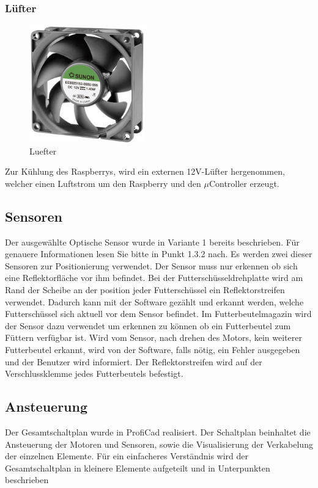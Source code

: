 \subsubsection{Lüfter}
\begin{figure}[H] 
\begin{center}

\includegraphics[width=5cm]{Bilder/Bauteile/Luefter}
\caption{Luefter}
\label{Luefter}

\end{center}
\end{figure}
Zur Kühlung des Raspberrys, wird ein externen 12V-Lüfter hergenommen, welcher einen Luftstrom um den Raspberry und den $\mu$Controller erzeugt.
\subsection{Sensoren}
Der ausgewählte Optische Sensor wurde in Variante 1 bereits beschrieben. Für genauere Informationen lesen Sie bitte in Punkt 1.3.2 nach.
Es werden zwei dieser Sensoren zur Positionierung verwendet. Der Sensor muss nur erkennen ob sich eine Reflektorfläche vor ihm befindet. Bei der Futterschüsseldrehplatte wird am Rand der Scheibe an der position jeder Futterschüssel ein Reflektorstreifen verwendet. Dadurch kann mit der Software gezählt und erkannt werden, welche Futterschüssel sich aktuell vor dem Sensor befindet. Im Futterbeutelmagazin wird der Sensor dazu verwendet um erkennen zu können ob ein Futterbeutel zum Füttern verfügbar ist. Wird vom Sensor, nach drehen des Motors, kein weiterer Futterbeutel erkannt, wird von der Software, falls nötig, ein Fehler ausgegeben und der Benutzer wird informiert. Der Reflektorstreifen wird auf der Verschlussklemme jedes Futterbeutels befestigt.
\subsection{Ansteuerung}
Der Gesamtschaltplan wurde in ProfiCad realisiert. Der Schaltplan beinhaltet die Ansteuerung der Motoren und Sensoren, sowie die Visualisierung der Verkabelung der einzelnen Elemente.
Für ein einfacheres Verständnis wird der Gesamtschaltplan in kleinere Elemente aufgeteilt und in Unterpunkten beschrieben
